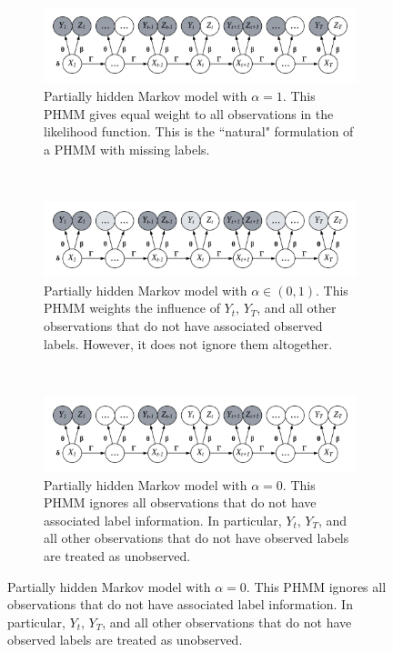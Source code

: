 \begin{figure}
    \centering
    \begin{subfigure}[t]{\textwidth}
        \centering
        \includegraphics[width = 6in]{plt/PHMM_alpha_one.png}
        \caption{Partially hidden Markov model with $\alpha = 1$. This PHMM gives equal weight to all observations in the likelihood function. This is the ``natural" formulation of a PHMM with missing labels.}
    \end{subfigure}%
    \\
    \begin{subfigure}[t]{\textwidth}
        \centering
        \includegraphics[width = 6in]{plt/PHMM_alpha_half.png}
        \caption{Partially hidden Markov model with $\alpha \in (0,1)$. This PHMM weights the influence of $Y_t$, $Y_T$, and all other observations that do not have associated observed labels. However, it does not ignore them altogether.}
    \end{subfigure}%
    \\
    \begin{subfigure}[t]{\textwidth}
        \centering
        \includegraphics[width = 6in]{plt/PHMM_alpha_zero.png}
        \caption{Partially hidden Markov model with $\alpha = 0$. This PHMM ignores all observations that do not have associated label information. In particular, $Y_t$, $Y_T$, and all other observations that do not have observed labels are treated as unobserved.}
    \end{subfigure}%

\end{figure}
